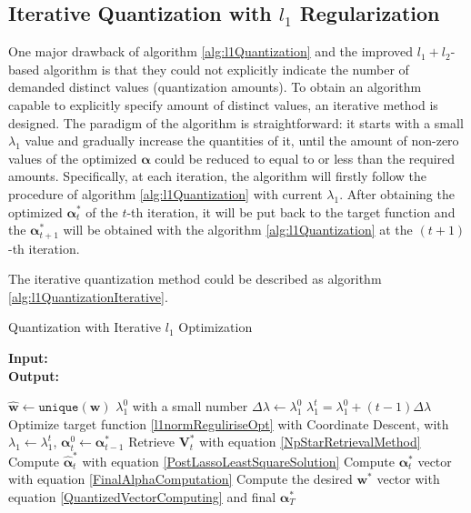 \documentclass[preprint,10pt]{elsarticle}
\begin{document}
\subsection{Iterative Quantization with $l_1$ Regularization}
One major drawback of algorithm \ref{alg:l1Quantization} and the improved $l_1 + l_2$-based algorithm is that they could not explicitly indicate the number of demanded distinct values (quantization amounts). To obtain an algorithm capable to explicitly specify amount of distinct values, an iterative method is designed. The paradigm of the algorithm is straightforward: it starts with a small $\lambda_1$ value and gradually increase the quantities of it, until the amount of non-zero values of the optimized $\boldsymbol{\alpha}$ could be reduced to equal to or less than the required amounts. Specifically, at each iteration, the algorithm will firstly follow the procedure of algorithm \ref{alg:l1Quantization} with current $\lambda_1$. After obtaining the optimized $\boldsymbol{\alpha}^{*}_{t}$ of the $t$-th iteration, it will be put back to the target function and the $\boldsymbol{\alpha}^{*}_{t+1}$ will be obtained with the algorithm \ref{alg:l1Quantization} at the $(t+1)$-th iteration.\par
The iterative quantization method could be described as algorithm \ref{alg:l1QuantizationIterative}.
\begin{algorithm}
\caption{Quantization with Iterative $l_1$ Optimization}\label{alg:l1QuantizationIterative}
\hspace*{\algorithmicindent} \textbf{Input: } \\
\hspace*{\algorithmicindent} \textbf{Output: } 
\begin{algorithmic}[1]
\State $\boldsymbol{\hat{w}} \gets \texttt{unique}(\boldsymbol{w})$
\State $\lambda_1^{0}$ with a small number
\State $\Delta\lambda \gets \lambda_1^{0}$
\State $\lambda_1^{t} = \lambda_1^{0} + (t-1)\Delta\lambda$
\State Optimize target function \ref{l1normReguliriseOpt} with Coordinate Descent, with $\lambda_1 \gets \lambda_1^{t}$, $\boldsymbol{\alpha}^{0}_{t} \gets \boldsymbol{\alpha}^{*}_{t-1}$
\State Retrieve $\boldsymbol{V}^{*}_{t}$ with equation \ref{NpStarRetrievalMethod}
\State Compute $\boldsymbol{\hat{\alpha}}^{*}_{t}$ with equation \ref{PostLassoLeastSquareSolution}
\State Compute $\boldsymbol{\alpha}^{*}_{t}$ vector with equation \ref{FinalAlphaComputation}
\EndWhile
\State Compute the desired $\boldsymbol{w}^{*}$ vector with equation \ref{QuantizedVectorComputing} and final $\boldsymbol{\alpha}^{*}_{T}$
\end{algorithmic}
\end{algorithm}
\end{document}
